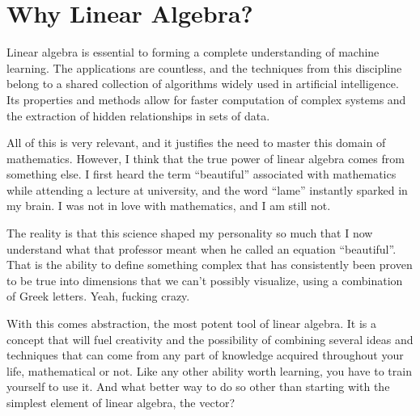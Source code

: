 \documentclass[600paper, 11pt,twoside,openany]{kdp}
\begin{document}
\chapter{Why Linear Algebra?}
\par 
\vspace{-3pt}
\indent Linear algebra is essential to forming a complete understanding of machine learning. The applications are countless, and the techniques from this discipline belong to a shared collection of algorithms widely used in artificial intelligence. Its properties and methods allow for faster computation of complex systems and the extraction of hidden relationships in sets of data. 
\par 
\vspace{-3pt}
\indent All of this is very relevant, and it justifies the need to master this domain of mathematics. However, I think that the true power of linear algebra comes from something else. I first heard the term “beautiful” associated with mathematics while attending a lecture at university, and the word “lame” instantly sparked in my brain. I was not in love with mathematics, and I am still not. 
\par 
\vspace{-3pt}
\indent The reality is that this science shaped my personality so much that I now understand what that professor meant when he called an equation “beautiful”. That is the ability to define something complex that has consistently been proven to be true into dimensions that we can’t possibly visualize, using a combination of Greek letters. Yeah, fucking crazy. 
\par 
\vspace{-3pt}
\indent With this comes abstraction, the most potent tool of linear algebra. It is a concept that will fuel creativity and the possibility of combining several ideas and techniques that can come from any part of knowledge acquired throughout your life, mathematical or not. Like any other ability worth learning, you have to train yourself to use it. And what better way to do so other than starting with the simplest element of linear algebra, the vector?
\end{document}
